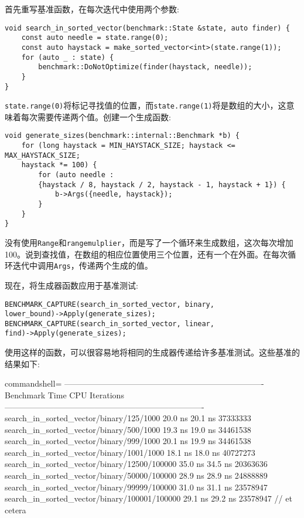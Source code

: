 首先重写基准函数，在每次迭代中使用两个参数:

\begin{lstlisting}[style=styleCXX]
void search_in_sorted_vector(benchmark::State &state, auto finder) {
	const auto needle = state.range(0);
	const auto haystack = make_sorted_vector<int>(state.range(1));
	for (auto _ : state) {
		benchmark::DoNotOptimize(finder(haystack, needle));
	}
}
\end{lstlisting}

\texttt{state.range(0)}将标记寻找值的位置，而\texttt{state.range(1)}将是数组的大小，这意味着每次需要传递两个值。创建一个生成函数:

\begin{lstlisting}[style=styleCXX]
void generate_sizes(benchmark::internal::Benchmark *b) {
	for (long haystack = MIN_HAYSTACK_SIZE; haystack <= MAX_HAYSTACK_SIZE;
	haystack *= 100) {
		for (auto needle :
		{haystack / 8, haystack / 2, haystack - 1, haystack + 1}) {
			b->Args({needle, haystack});
		}
	}
}
\end{lstlisting}

没有使用\texttt{Range}和\texttt{rangemulplier}，而是写了一个循环来生成数组，这次每次增加100。说到查找值，在数组的相应位置使用三个位置，还有一个在外面。在每次循环迭代中调用\texttt{Args}，传递两个生成的值。

现在，将生成器函数应用于基准测试:

\begin{lstlisting}[style=styleCXX]
BENCHMARK_CAPTURE(search_in_sorted_vector, binary,
lower_bound)->Apply(generate_sizes);
BENCHMARK_CAPTURE(search_in_sorted_vector, linear,
find)->Apply(generate_sizes);
\end{lstlisting}

使用这样的函数，可以很容易地将相同的生成器传递给许多基准测试。这些基准的结果如下:

\begin{tcblisting}{commandshell={}}
-------------------------------------------------------------------------
Benchmark Time CPU Iterations
-------------------------------------------------------------------------
search_in_sorted_vector/binary/125/1000 20.0 ns 20.1 ns 37333333
search_in_sorted_vector/binary/500/1000 19.3 ns 19.0 ns 34461538
search_in_sorted_vector/binary/999/1000 20.1 ns 19.9 ns 34461538
search_in_sorted_vector/binary/1001/1000 18.1 ns 18.0 ns 40727273
search_in_sorted_vector/binary/12500/100000 35.0 ns 34.5 ns 20363636
search_in_sorted_vector/binary/50000/100000 28.9 ns 28.9 ns 24888889
search_in_sorted_vector/binary/99999/100000 31.0 ns 31.1 ns 23578947
search_in_sorted_vector/binary/100001/100000 29.1 ns 29.2 ns 23578947
// et cetera
\end{tcblisting}

